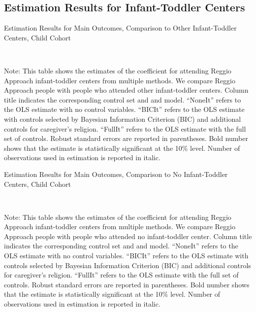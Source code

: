 

\subsection{Estimation Results for Infant-Toddler Centers}



\begin{table}[H] \caption{Estimation Results for Main Outcomes, Comparison to Other Infant-Toddler Centers, Child Cohort} \label{ols-M-child-reg-pres-asilo}
\scalebox{0.8}{}
\vspace{1ex} \\
\footnotesize\raggedright{Note: This table shows the estimates of the coefficient for attending Reggio Approach infant-toddler centers from multiple methods. We compare Reggio Approach people with people who attended other infant-toddler centers. Column title indicates the corresponding control set and and model. ``NoneIt'' refers to the OLS estimate with no control variables. ``BICIt'' refers to the OLS estimate with controls selected by Bayesian Information Criterion (BIC) and additional controls for caregiver's religion. ``FullIt'' refers to the OLS estimate with the full set of controls. Robust standard errors are reported in parentheses. Bold number shows that the estimate is statistically significant at the 10\% level. Number of observations used in estimation is reported in italic.}

\end{table}


\begin{table}[H] \caption{Estimation Results for Main Outcomes, Comparison to No Infant-Toddler Centers, Child Cohort} \label{ols-M-child-reg-nopres-asilo}
\scalebox{0.8}{}
\vspace{1ex} \\
\footnotesize\raggedright{Note: This table shows the estimates of the coefficient for attending Reggio Approach infant-toddler centers from multiple methods. We compare Reggio Approach people with people who attended no infant-toddler center. Column title indicates the corresponding control set and and model. ``NoneIt'' refers to the OLS estimate with no control variables. ``BICIt'' refers to the OLS estimate with controls selected by Bayesian Information Criterion (BIC) and additional controls for caregiver's religion. ``FullIt'' refers to the OLS estimate with the full set of controls. Robust standard errors are reported in parentheses. Bold number shows that the estimate is statistically significant at the 10\% level. Number of observations used in estimation is reported in italic.}

\end{table}


